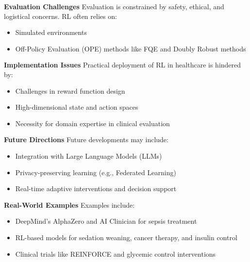 \textbf{Evaluation Challenges}
Evaluation is constrained by safety, ethical, and logistical concerns. RL often relies on: \begin{itemize} \item Simulated environments \item Off-Policy Evaluation (OPE) methods like FQE and Doubly Robust methods \end{itemize}

\textbf{Implementation Issues}
Practical deployment of RL in healthcare is hindered by: \begin{itemize} \item Challenges in reward function design \item High-dimensional state and action spaces \item Necessity for domain expertise in clinical evaluation \end{itemize}

\textbf{Future Directions}
Future developments may include: \begin{itemize} \item Integration with Large Language Models (LLMs) \item Privacy-preserving learning (e.g., Federated Learning) \item Real-time adaptive interventions and decision support \end{itemize}

\textbf{Real-World Examples}
Examples include: \begin{itemize} \item DeepMind’s AlphaZero and AI Clinician for sepsis treatment \item RL-based models for sedation weaning, cancer therapy, and insulin control \item Clinical trials like REINFORCE and glycemic control interventions \end{itemize}

